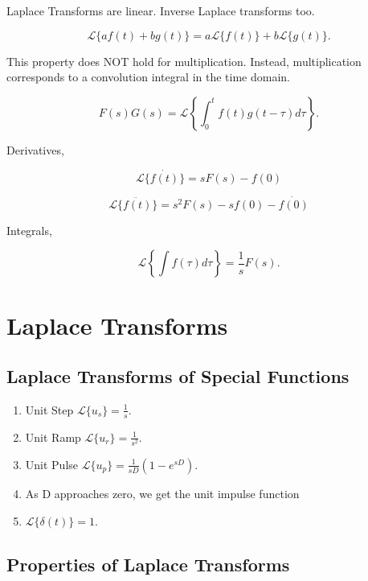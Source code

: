 \documentclass[12pt, a4paper]{report}
\begin{document}
  Laplace Transforms are linear. Inverse Laplace transforms too.

  \[
      \mathcal{L}\{af(t) + bg(t)\} = a \mathcal{L}\{f(t)\} + b \mathcal{L}\{g(t)\}
    .\]

  This property does NOT hold for multiplication. Instead, multiplication corresponds to a convolution integral in the time domain.

  \[
      F(s)G(s) = \mathcal{L}\left\{\int_0^t f(t)g(t - \tau) d\tau\right\}
    .\]

  Derivatives,

  \begin{equation}
    \mathcal{L}\{\dot{f(t)}\} = sF(s) - f(0)
  \end{equation}

  \begin{equation}
    \mathcal{L}\{\ddot{f(t)}\} = s ^2 F(s) - sf(0) - \dot{f(0)}
  \end{equation}

  Integrals,

  \[
      \mathcal{L}\left\{\int f(\tau)d \tau \right\} = \frac{1}{s} F(s)
    .\]


  \chapter{Laplace Transforms}

  \section{Laplace Transforms of Special Functions}

  \begin{enumerate}
    \item Unit Step $ \mathcal{L}\{u_s\} = \frac{1}{s}. $
    \item Unit Ramp $ \mathcal{L}\{u_r\} = \frac{1}{s ^2}. $
    \item Unit Pulse $ \mathcal{L}\{u_p\} = \frac{1}{sD} \left( 1-e^{sD} \right). $
    \item As D approaches zero, we get the unit impulse function
    \item $ \mathcal{L}\{\delta(t)\} = 1. $
  \end{enumerate}

  \section{Properties of Laplace Transforms}
\end{document}
